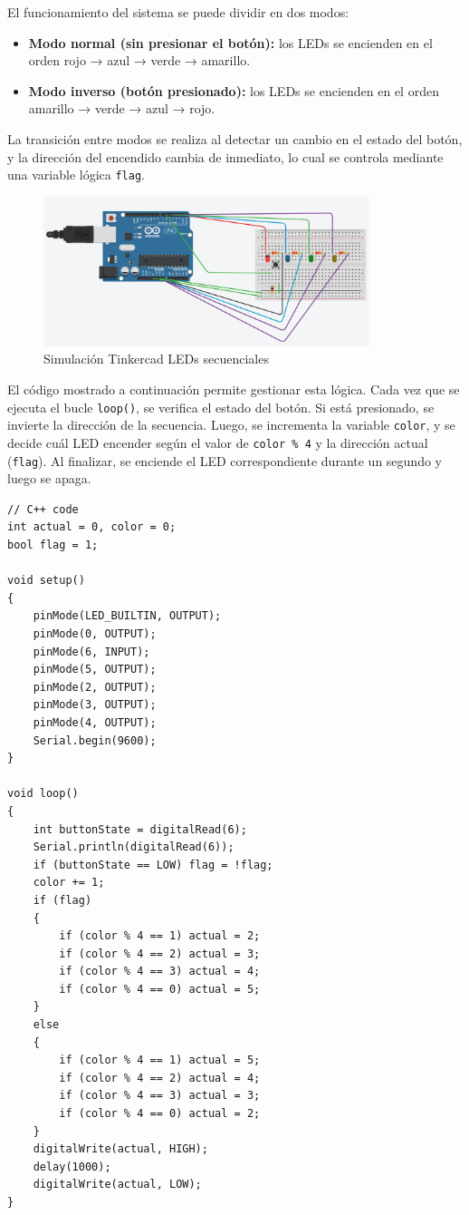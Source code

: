 \documentclass{article}
\begin{document}
El funcionamiento del sistema se puede dividir en dos modos: 
\begin{itemize}
    \item \textbf{Modo normal (sin presionar el botón):} los LEDs se encienden en el orden rojo → azul → verde → amarillo.
    \item \textbf{Modo inverso (botón presionado):} los LEDs se encienden en el orden amarillo → verde → azul → rojo.
\end{itemize}

La transición entre modos se realiza al detectar un cambio en el estado del botón, y la dirección del encendido cambia de inmediato, lo cual se controla mediante una variable lógica \texttt{flag}.

\begin{figure}[H]
    \centering
    \includegraphics[width=0.85\textwidth]{./img/ckpt_6_0.png}
    \caption{Simulación Tinkercad LEDs secuenciales}
    \label{fig:leds_secuenciales}
\end{figure}

El código mostrado a continuación permite gestionar esta lógica. Cada vez que se ejecuta el bucle \texttt{loop()}, se verifica el estado del botón. Si est\'a presionado, se invierte la dirección de la secuencia. Luego, se incrementa la variable \texttt{color}, y se decide cu\'al LED encender según el valor de \texttt{color \% 4} y la dirección actual (\texttt{flag}). Al finalizar, se enciende el LED correspondiente durante un segundo y luego se apaga.


\begin{lstlisting}[style=cppstyle, caption={Código en C++ para el control de LEDs secuenciales.}, label={code:leds_secuenciales}]
// C++ code
int actual = 0, color = 0;
bool flag = 1;

void setup()
{
    pinMode(LED_BUILTIN, OUTPUT);
    pinMode(0, OUTPUT);
    pinMode(6, INPUT);
    pinMode(5, OUTPUT);
    pinMode(2, OUTPUT);
    pinMode(3, OUTPUT);
    pinMode(4, OUTPUT);
    Serial.begin(9600);
}

void loop()
{ 
    int buttonState = digitalRead(6);
    Serial.println(digitalRead(6));
    if (buttonState == LOW) flag = !flag;
    color += 1;
    if (flag)
    {
        if (color % 4 == 1) actual = 2;
        if (color % 4 == 2) actual = 3;
        if (color % 4 == 3) actual = 4;
        if (color % 4 == 0) actual = 5;
    } 
    else 
    {
        if (color % 4 == 1) actual = 5;
        if (color % 4 == 2) actual = 4;
        if (color % 4 == 3) actual = 3;
        if (color % 4 == 0) actual = 2;
    }
    digitalWrite(actual, HIGH);
    delay(1000);
    digitalWrite(actual, LOW);
}
\end{lstlisting}
\end{document}

